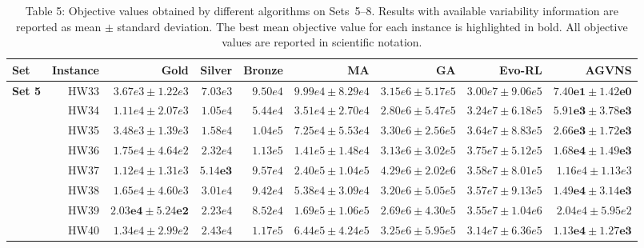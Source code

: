 \documentclass[11pt]{article}
\begin{document}
{\color{blue}
\begin{table}
\centering
\caption*{Table 5: Objective values obtained by different algorithms on Sets~5--8.
Results with available variability information are reported as mean $\pm$ standard deviation.
The best mean objective value for each instance is highlighted in bold.
All objective values are reported in scientific notation.}
\label{tab:results_set5_8}

\setlength{\tabcolsep}{2.5pt}
\scriptsize

\begin{tabular}{l|r|r|r|r|r|r|r|r}
\hline
\textbf{Set}
& \textbf{Instance}
& \textbf{Gold}
& \textbf{Silver}
& \textbf{Bronze}
& \textbf{MA}
& \textbf{GA}
& \textbf{Evo-RL}
& \textbf{AGVNS} \\
\hline

\multirow{8}{*}{\textbf{Set 5}}
& HW33 & $3.67e3 \pm 1.22e3$ & $7.03e3$ & $9.50e4$
& $9.99e4 \pm 8.29e4$ & $3.15e6 \pm 5.17e5$
& $3.00e7 \pm 9.06e5$ & $\mathbf{7.40e1 \pm 1.42e0}$ \\

& HW34 & $1.11e4 \pm 2.07e3$ & $1.05e4$ & $5.44e4$
& $3.51e4 \pm 2.70e4$ & $2.80e6 \pm 5.47e5$
& $3.24e7 \pm 6.18e5$ & $\mathbf{5.91e3 \pm 3.78e3}$ \\

& HW35 & $3.48e3 \pm 1.39e3$ & $1.58e4$ & $1.04e5$
& $7.25e4 \pm 5.53e4$ & $3.30e6 \pm 2.56e5$
& $3.64e7 \pm 8.83e5$ & $\mathbf{2.66e3 \pm 1.72e3}$ \\

& HW36 & $1.75e4 \pm 4.64e2$ & $2.32e4$ & $1.13e5$
& $1.41e5 \pm 1.48e4$ & $3.13e6 \pm 3.02e5$
& $3.75e7 \pm 5.12e5$ & $\mathbf{1.68e4 \pm 1.49e3}$ \\

& HW37 & $1.12e4 \pm 1.31e3$ & $\mathbf{5.14e3}$ & $9.57e4$
& $2.40e5 \pm 1.04e5$ & $4.29e6 \pm 2.02e6$
& $3.58e7 \pm 8.01e5$ & $1.16e4 \pm 1.13e3$ \\

& HW38 & $1.65e4 \pm 4.60e3$ & $3.01e4$ & $9.42e4$
& $5.38e4 \pm 3.09e4$ & $3.20e6 \pm 5.05e5$
& $3.57e7 \pm 9.13e5$ & $\mathbf{1.49e4 \pm 3.14e3}$ \\

& HW39 & $\mathbf{2.03e4 \pm 5.24e2}$ & $2.23e4$ & $8.52e4$
& $1.69e5 \pm 1.06e5$ & $2.69e6 \pm 4.30e5$
& $3.55e7 \pm 1.04e6$ & $2.04e4 \pm 5.95e2$ \\

& HW40 & $1.34e4 \pm 2.99e2$ & $2.43e4$ & $1.17e5$
& $6.44e5 \pm 4.24e5$ & $3.25e6 \pm 5.95e5$
& $3.14e7 \pm 6.36e5$ & $\mathbf{1.13e4 \pm 1.27e3}$ \\
\hline


\end{tabular}
\end{table}}
\end{document}
